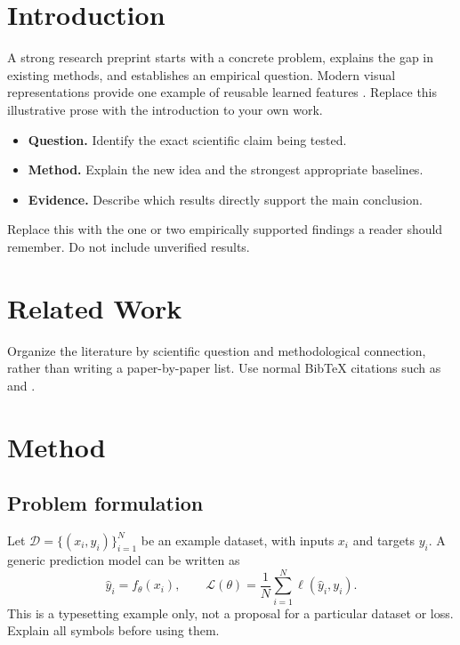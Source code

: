 \documentclass[11pt]{article}
\begin{document}
\makeillinoistitle
\illustrativeteaser

\section{Introduction}
A strong research preprint starts with a concrete problem, explains the gap in existing methods, and establishes an empirical question. Modern visual representations provide one example of reusable learned features \citep{he2016deep,vaswani2017attention}. Replace this illustrative prose with the introduction to your own work.

\begin{itemize}
  \item \textbf{Question.} Identify the exact scientific claim being tested.
  \item \textbf{Method.} Explain the new idea and the strongest appropriate baselines.
  \item \textbf{Evidence.} Describe which results directly support the main conclusion.
\end{itemize}

\begin{takeaway}
Replace this with the one or two empirically supported findings a reader should remember. Do not include unverified results.
\end{takeaway}

\section{Related Work}
Organize the literature by scientific question and methodological connection, rather than writing a paper-by-paper list. Use normal BibTeX citations such as \citet{he2016deep} and \citet{vaswani2017attention}.

\section{Method}
\label{sec:method}
\subsection{Problem formulation}
Let $\mathcal{D}=\{(x_i,y_i)\}_{i=1}^{N}$ be an example dataset, with inputs $x_i$ and targets $y_i$. A generic prediction model can be written as
\begin{equation}
  \hat y_i = f_{\theta}(x_i),\qquad
  \mathcal{L}(\theta)=\frac{1}{N}\sum_{i=1}^{N}\ell(\hat y_i,y_i).
  \label{eq:objective}
\end{equation}
This is a typesetting example only, not a proposal for a particular dataset or loss. Explain all symbols before using them.
\end{document}
